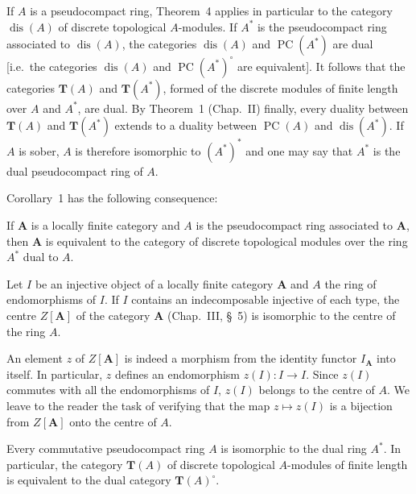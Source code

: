 If $A$ is a pseudocompact ring, Theorem~4 applies in particular to the
category $\operatorname{dis}(A)$ of discrete topological $A$-modules.
If $A^*$ is the pseudocompact ring associated to
$\operatorname{dis}(A)$, the categories $\operatorname{dis}(A)$ and
$\operatorname{PC}(A^*)$ are dual [i.e.\ the categories
$\operatorname{dis}(A)$ and $\operatorname{PC}(A^*)^\circ$ are
equivalent]. It follows that the categories $\mathbf{T}(A)$ and
$\mathbf{T}(A^*)$, formed of the discrete modules of finite length over
$A$ and $A^*$, are dual. By Theorem~1 (Chap.~II) finally, every duality
between $\mathbf{T}(A)$ and $\mathbf{T}(A^*)$ extends to a duality
between $\operatorname{PC}(A)$ and $\operatorname{dis}(A^*)$. If $A$ is
sober, $A$ is therefore isomorphic to $(A^*)^*$ and one may say that
$A^*$ is the dual pseudocompact ring of $A$.

Corollary~1 has the following consequence:

\begin{corollary}
If $\mathbf{A}$ is a locally finite category and $A$ is the
pseudocompact ring associated to $\mathbf{A}$, then $\mathbf{A}$ is
equivalent to the category of discrete topological modules over the
ring $A^*$ dual to $A$.
\end{corollary}

\begin{corollary}
Let $I$ be an injective object of a locally finite category
$\mathbf{A}$ and $A$ the ring of endomorphisms of $I$. If $I$ contains
an indecomposable injective of each type, the centre $Z[\mathbf{A}]$ of
the category $\mathbf{A}$ (Chap.~III, \S~5) is isomorphic to the centre
of the ring $A$.
\end{corollary}

An element $z$ of $Z[\mathbf{A}]$ is indeed a morphism from the
identity functor $I_{\mathbf{A}}$ into itself. In particular, $z$
defines an endomorphism $z(I)\colon I\to I$. Since $z(I)$ commutes with
all the endomorphisms of $I$, $z(I)$ belongs to the centre of $A$. We
leave to the reader the task of verifying that the map $z\mapsto z(I)$
is a bijection from $Z[\mathbf{A}]$ onto the centre of $A$.

\begin{corollary}
Every commutative pseudocompact ring $A$ is isomorphic to the dual ring
$A^*$. In particular, the category $\mathbf{T}(A)$ of discrete
topological $A$-modules of finite length is equivalent to the dual
category $\mathbf{T}(A)^\circ$.
\end{corollary}

